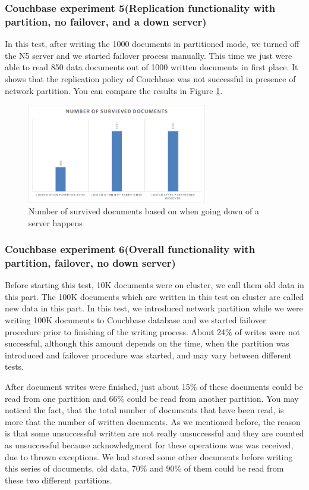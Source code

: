\documentclass[a4paper]{article}
\begin{document}
\subsubsection{Couchbase experiment 5(Replication functionality with partition, no failover, and a down server)}
In this test, after writing the 1000 documents in partitioned mode, we turned off the N5 server and we started failover process manually.
This time we just were able to read 850 data documents out of 1000 written documents in first place. 
It shows that the replication policy of Couchbase was not successful in presence of network partition.
You can compare the results in Figure \ref{fig:diagram6}.
\begin{figure}[h!]
	\centering
	\includegraphics[width=0.7\textwidth]{diagram6}
	\caption{Number of survived documents based on when going down of a server happens}
	\label{fig:diagram6}
\end{figure}

\subsubsection{Couchbase experiment 6(Overall functionality with partition, failover, no down server)}
Before starting this test, 10K documents were on cluster, we call them old data in this part.
The 100K documents which are written in this test on cluster are called new data in this part. 
In this test, we introduced network partition while we were writing 100K documents to Couchbase database and we started failover procedure prior to finishing of the writing process. 
About 24\% of writes were not successful, although this amount depends on the time, when the partition was introduced and failover procedure was started, and may vary between different tests.

After document writes were finished, just about 15\% of these documents could be read from one partition and 66\% could be read from another partition.
You may noticed the fact, that the total number of documents that have been read, is more that the number of written documents.
As we mentioned before, the reason is that some unsuccessful written are not really unsuccessful and they are counted as unsuccessful because acknowledgment for these operations was was received, due to thrown exceptions. 
We had stored some other documents before writing this series of documents, old data, 70\% and 90\% of them could be read from these two different partitions.
\end{document}
